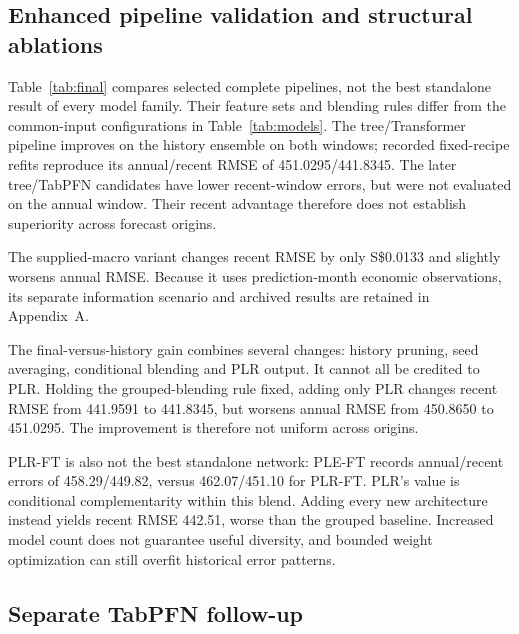 \documentclass[conference]{IEEEtran}
\newcommand{\sgd}{S\$}
\begin{document}
\subsection{Enhanced pipeline validation and structural ablations}
\begin{table}[t]
\caption{Selected pipeline RMSE (SGD). Annual: 114,842 fit through March 2024 / 35,158 validation in April 2024--March 2025. Recent: 121,005 fit through May 2024 / 28,995 validation in June 2024--March 2025. Overlapping development windows; -- means not evaluated.}
\label{tab:final}
\centering\small

\end{table}

Table~\ref{tab:final} compares selected complete pipelines, not the best standalone result of every model family. Their feature sets and blending rules differ from the common-input configurations in Table~\ref{tab:models}. The tree/Transformer pipeline improves on the history ensemble on both windows; recorded fixed-recipe refits reproduce its annual/recent RMSE of 451.0295/441.8345. The later tree/TabPFN candidates have lower recent-window errors, but were not evaluated on the annual window. Their recent advantage therefore does not establish superiority across forecast origins.

The supplied-macro variant changes recent RMSE by only \sgd0.0133 and slightly worsens annual RMSE. Because it uses prediction-month economic observations, its separate information scenario and archived results are retained in Appendix~A.

The final-versus-history gain combines several changes: history pruning, seed averaging, conditional blending and PLR output. It cannot all be credited to PLR. Holding the grouped-blending rule fixed, adding only PLR changes recent RMSE from 441.9591 to 441.8345, but worsens annual RMSE from 450.8650 to 451.0295. The improvement is therefore not uniform across origins.

PLR-FT is also not the best standalone network: PLE-FT records annual/recent errors of 458.29/449.82, versus 462.07/451.10 for PLR-FT. PLR's value is conditional complementarity within this blend. Adding every new architecture instead yields recent RMSE 442.51, worse than the grouped baseline. Increased model count does not guarantee useful diversity, and bounded weight optimization can still overfit historical error patterns.

\subsection{Separate TabPFN follow-up}
\begin{table}[t]
\caption{Separate recent-window follow-up: frozen TabPFN-3.5-Fast and the reproduced seven-tree ensemble. This tree ensemble is an earlier model, not the submitted 12-channel final.}
\label{tab:tabpfn}
\centering\small

\end{table}
\end{document}
